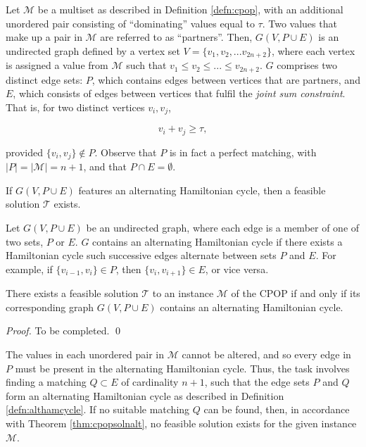 \documentclass[oribibl]{llncs}
\begin{document}
Let $\mathcal{M}$ be a multiset as described in Definition \ref{defn:cpop}, with an additional unordered pair consisting of ``dominating'' values equal to $\tau$. Two values that make up a pair in $\mathcal{M}$ are referred to as ``partners''. Then, $G(V, P \cup E)$ is an undirected graph defined by a vertex set $V = \{v_1, v_2, ...v_{2n+2}\}$, where each vertex is assigned a value from $\mathcal{M}$ such that $v_1 \leq v_2 \leq ... \leq v_{2n+2}$. $G$ comprises two distinct edge sets: $P$, which contains edges between vertices that are partners, and $E$, which consists of edges between vertices that fulfil the \textit{joint sum constraint}. That is, for two distinct vertices $v_i, v_j$,

\begin{equation}
	\label{eqn:jointsum}
	v_i + v_j \geq \tau,
\end{equation}

provided $\{v_i, v_j\} \notin P$. Observe that $P$ is in fact a perfect matching, with $|P| = |\mathcal{M}| = n+1$, and that $P \cap E = \emptyset$.

If $G(V, P\cup E)$ features an alternating Hamiltonian cycle, then a feasible solution $\mathcal{T}$ exists.

\begin{definition}
	\label{defn:althamcycle}
	Let $G(V, P\cup E)$ be an undirected graph, where each edge is a member of one of two sets, $P$ or $E$. $G$ contains an alternating Hamiltonian cycle if there exists a Hamiltonian cycle such successive edges alternate between sets $P$ and $E$. For example, if $\{v_{i-1}, v_i\} \in P$, then $\{v_i, v_{i+1}\} \in E$, or vice versa.
\end{definition}

\begin{theorem}
	\label{thm:cpopsolnalt}
	There exists a feasible solution $\mathcal{T}$ to an instance $\mathcal{M}$ of the CPOP if and only if its corresponding graph $G(V, P\cup E)$ contains an alternating Hamiltonian cycle.
\end{theorem}
\begin{proof}
	To be completed. \qed
\end{proof}

The values in each unordered pair in $\mathcal{M}$ cannot be altered, and so every edge in $P$ must be present in the alternating Hamiltonian cycle. Thus, the task involves finding a matching $Q \subset E$ of cardinality $n+1$, such that the edge sets $P$ and $Q$ form an alternating Hamiltonian cycle as described in Definition \ref{defn:althamcycle}. If no suitable matching $Q$ can be found, then, in accordance with Theorem \ref{thm:cpopsolnalt}, no feasible solution exists for the given instance $\mathcal{M}$.
\end{document}
